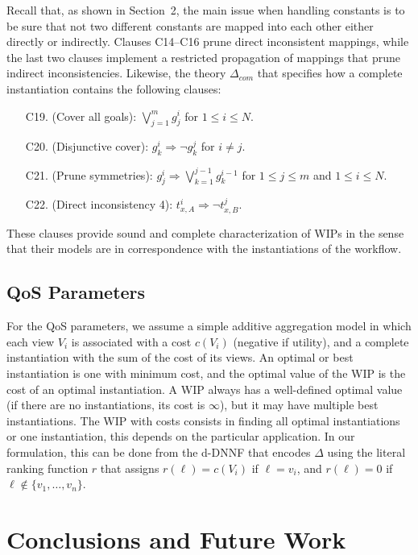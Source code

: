 \documentclass{llncs}
\begin{document}
Recall that, as shown in Section~2, the main issue when handling
constants is to be sure that not two different constants are mapped
into each other either directly or indirectly.
Clauses C14--C16 prune direct inconsistent mappings, while the last
two clauses implement a restricted propagation of mappings that prune
indirect inconsistencies.
Likewise, the theory $\Delta_{com}$ that specifies how a complete
instantiation contains the following clauses:
\begin{enumerate}[C10.]
\item[C19.] (Cover all goals): $\bigvee_{j=1}^m g^i_j$ for $1\leq i\leq N$.
\item[C20.] (Disjunctive cover): $g^i_k \Rightarrow \neg g^j_k$ for $i\neq j$.
\item[C21.] (Prune symmetries): $g^i_j \Rightarrow \bigvee_{k=1}^{j-1} g^{i-1}_k$
            for $1\leq j\leq m$ and $1\leq i\leq N$.
\item[C22.] (Direct inconsistency 4): $t^i_{x,A} \Rightarrow \neg t^j_{x,B}$.
\end{enumerate}
These clauses provide sound and complete characterization of WIPs in the
sense that their models are in correspondence with the
instantiations of the workflow.

\subsection{QoS Parameters}

For the QoS parameters, we assume a simple additive aggregation model in
which each view $V_i$ is associated with a cost $c(V_i)$ (negative if utility),
and a complete instantiation with the sum of the cost of its views.
An optimal or best instantiation is one with minimum cost, and the
optimal value of the WIP is the cost of an optimal instantiation.
A WIP always has a well-defined optimal value (if there are no instantiations,
its cost is $\infty$), but it may have multiple best instantiations.
The WIP with costs consists in finding all optimal instantiations or
one instantiation, this depends on the particular application.
In our formulation, this can be done from the d-DNNF that encodes $\Delta$
using the literal ranking function $r$ that assigns $r(\ell)=c(V_i)$ if
$\ell=v_i$, and $r(\ell)=0$ if $\ell\notin\{v_1,\ldots,v_n\}$.

\section{Conclusions and Future Work}
\end{document}

